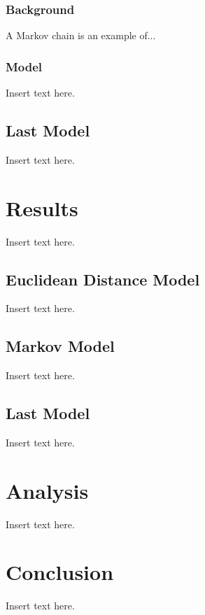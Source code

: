 \documentclass[twoside,twocolumn]{article}
\begin{document}
\subsubsection{Background}

A Markov chain is an example of...

\subsubsection{Model}
Insert text here.
\subsection{Last Model} %
Insert text here.

\section{Results}
\label{sec:res}
Insert text here.
\subsection{Euclidean Distance Model}
Insert text here.
\subsection{Markov Model}
Insert text here.
\subsection{Last Model}
Insert text here.

\section{Analysis}
\label{sec:analysis}
Insert text here.

\section{Conclusion}
\label{sec:conclusion}
Insert text here.
\end{document}

